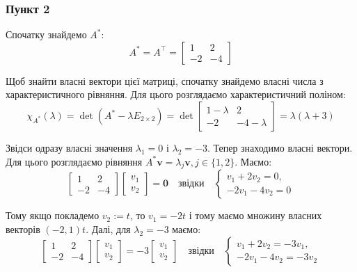 \documentclass{hw_template}
\begin{document}
\subsubsection*{Пункт 2}

Спочатку знайдемо $A^*$:
\begin{equation*}
    A^* = A^{\top} = \begin{bmatrix}
        1 & 2 \\
        -2 & -4
    \end{bmatrix}
\end{equation*}

Щоб знайти власні вектори цієї матриці, спочатку знайдемо власні числа з характеристичного рівняння. Для цього розглядаємо характеристичний поліном:
\begin{equation*}
    \chi_{A^*}(\lambda) = \det(A^* - \lambda E_{2 \times 2}) = \det \begin{bmatrix}
        1-\lambda & 2 \\
        -2 & -4-\lambda
    \end{bmatrix} = \lambda(\lambda+3)
\end{equation*}

Звідси одразу власні значення $\lambda_1 = 0$ і $\lambda_2 = -3$. Тепер знаходимо власні вектори. Для цього розглядаємо рівняння $A^*\mathbf{v} = \lambda_{j}\mathbf{v}, j \in \{1,2\}$. Маємо:
\begin{equation*}
    \begin{bmatrix}
        1 & 2 \\
        -2 & -4
    \end{bmatrix}\begin{bmatrix}
        v_1 \\ v_2
    \end{bmatrix} = \mathbf{0} \quad \text{звідки} \quad \begin{cases}
        v_1 + 2v_2 = 0, \\
        -2v_1 - 4v_2 = 0
    \end{cases}
\end{equation*}

Тому якщо покладемо $v_2 := t$, то $v_1 = -2t$ і тому маємо множину власних векторів $(-2,1)t$. Далі, для $\lambda_2=-3$ маємо:
\begin{equation*}
    \begin{bmatrix}
        1 & 2 \\
        -2 & -4
    \end{bmatrix}\begin{bmatrix}
        v_1 \\ v_2
    \end{bmatrix} = -3\begin{bmatrix}
        v_1 \\ v_2
    \end{bmatrix} \quad \text{звідки} \quad \begin{cases}
        v_1 + 2v_2 = -3v_1, \\
        -2v_1 - 4v_2 = -3v_2
    \end{cases}
\end{equation*}
\end{document}
